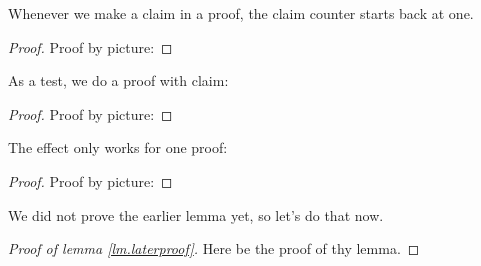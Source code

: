 \documentclass[thesis]{subfiles}
\begin{document}
\vspace{0.5cm}
\vspace{0.5cm}

\begin{remark}
Whenever we make a claim in a proof, the claim counter starts back at one.
\begin{proof}
Proof by picture:
\end{proof}
\end{remark}


\begin{remark}
As a test, we do a proof with claim:
\begin{proof}
Proof by picture:
\end{proof}
\end{remark}

\begin{remark}
The effect only works for one proof:
\begin{proof}
Proof by picture:
\end{proof}
\end{remark}

We did not prove the earlier lemma yet, so let's do that now.
\begin{proof}[Proof of lemma \ref{lm.laterproof}]
Here be the proof of thy lemma.
\end{proof}
\end{document}
